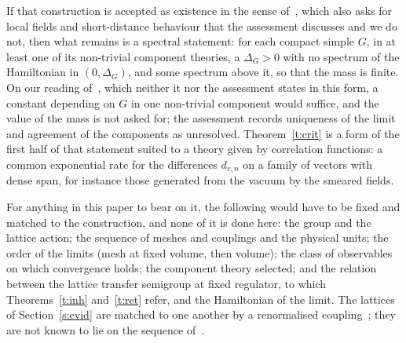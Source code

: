If that construction is accepted as existence in the sense of~\cite{JW}, which also asks for local fields and
short-distance behaviour that the assessment discusses and we do not, then what remains is a spectral
statement: for each compact simple $G$, in at least one of its non-trivial component theories, a $\Delta_G>0$
with no spectrum of the Hamiltonian in $(0,\Delta_G)$, and some spectrum above it, so that the mass is finite.
On our reading of~\cite{JW}, which neither it nor the assessment states in this form, a constant depending
on $G$ in one non-trivial component would suffice, and the value of the mass is not asked for; the
assessment records uniqueness of the limit and agreement of the components as unresolved. Theorem~\ref{t:crit} is a form of the first half of that statement suited to a
theory given by correlation functions: a common exponential rate for the differences $d_{v,n}$ on a family of
vectors with dense span, for instance those generated from the vacuum by the smeared fields.

For anything in this paper to bear on it, the following would have to be fixed and matched to the
construction, and none of it is done here: the group and the lattice action; the sequence of meshes and
couplings and the physical units; the order of the limits (mesh at fixed volume, then volume); the class of
observables on which convergence holds; the component theory selected; and the relation between the lattice
transfer semigroup at fixed regulator, to which Theorems~\ref{t:inh} and~\ref{t:ret} refer, and the
Hamiltonian of the limit. The lattices of Section~\ref{s:evid} are matched to one another by a renormalised
coupling~\cite{RepoData}; they are not known to lie on the sequence of~\cite{OAI}.


